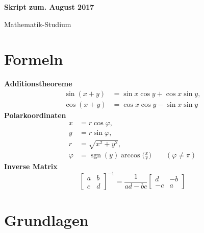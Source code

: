 \documentclass[a4paper,11pt,fleqn,twoside]{scrartcl}
\numberwithin{equation}{section}
\newcommand{\strong}[1]{{\sf\bfseries #1}}
\begin{document}
\thispagestyle{empty}

\noindent
{\huge\sf\bfseries
Skript zum\hfill {\normalsize\rmfamily{}. August 2017}
\par\noindent
Mathematik-Studium
\par}

\tableofcontents

\newpage
\section*{Formeln}
\strong{Additionstheoreme}
\begin{align*}
\sin(x+y) &= \sin x\cos y + \cos x\sin y,\\
\cos(x+y) &= \cos x\cos y - \sin x\sin y
\end{align*}
\strong{Polarkoordinaten}
\begin{align*}
x &= r\cos\varphi,\\
y &= r\sin\varphi,\\
r &= \sqrt{x^2+y^2},\\
\varphi &= \operatorname{sgn}(y)\arccos\Big(\frac{x}{r}\Big)\qquad (\varphi\ne\pi)
\end{align*}
\strong{Inverse Matrix}
\[
\begin{bmatrix}
a & b\\
c & d
\end{bmatrix}^{-1}
= \frac{1}{ad-bc} \begin{bmatrix}
d & -b\\
-c & a
\end{bmatrix}
\]

\newpage

\section{Grundlagen}
\end{document}
